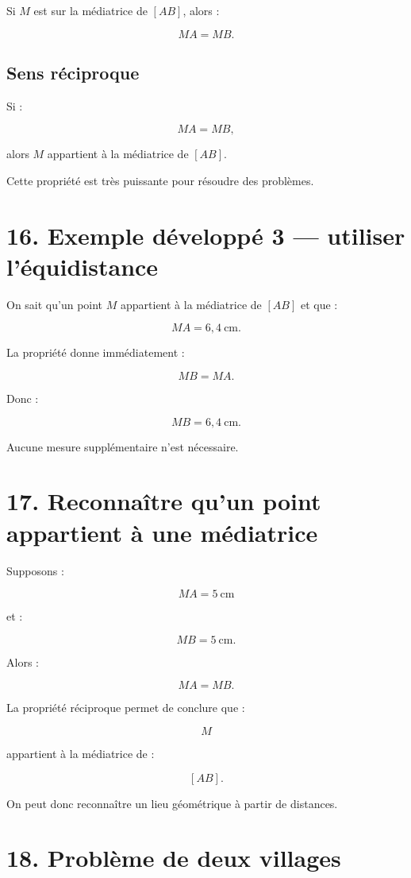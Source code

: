 Si $M$ est sur la médiatrice de $[AB]$, alors :

\[
MA=MB.
\]

\subsection{Sens réciproque}

Si :

\[
MA=MB,
\]

alors $M$ appartient à la médiatrice de $[AB]$.

Cette propriété est très puissante pour résoudre des problèmes.

\section{16. Exemple développé 3 — utiliser l’équidistance}

On sait qu’un point $M$ appartient à la médiatrice de $[AB]$ et que :

\[
MA=6{,}4\ \text{cm}.
\]

La propriété donne immédiatement :

\[
MB=MA.
\]

Donc :

\[
\boxed{MB=6{,}4\ \text{cm}}.
\]

Aucune mesure supplémentaire n’est nécessaire.

\section{17. Reconnaître qu’un point appartient à une médiatrice}

Supposons :

\[
MA=5\ \text{cm}
\]

et :

\[
MB=5\ \text{cm}.
\]

Alors :

\[
MA=MB.
\]

La propriété réciproque permet de conclure que :

\[
M
\]

appartient à la médiatrice de :

\[
[AB].
\]

On peut donc reconnaître un lieu géométrique à partir de distances.

\section{18. Problème de deux villages}

